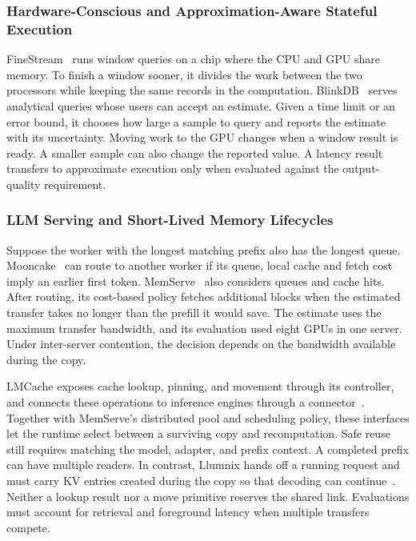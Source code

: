 \documentclass[manuscript]{acmart}
\begin{document}
\subsubsection{Hardware-Conscious and Approximation-Aware Stateful Execution}

FineStream~\cite{zhang2020finestream} runs window queries on a chip where the CPU and GPU share memory. To finish a window sooner, it divides the work between the two processors while keeping the same records in the computation. BlinkDB~\cite{agarwal2013blinkdb} serves analytical queries whose users can accept an estimate. Given a time limit or an error bound, it chooses how large a sample to query and reports the estimate with its uncertainty. Moving work to the GPU changes when a window result is ready. A smaller sample can also change the reported value. A latency result transfers to approximate execution only when evaluated against the output-quality requirement.

\subsubsection{LLM Serving and Short-Lived Memory Lifecycles}\label{sec:serving-comparison}

Suppose the worker with the longest matching prefix also has the longest queue. Mooncake~\cite{qin2025mooncake} can route to another worker if its queue, local cache and fetch cost imply an earlier first token. MemServe~\cite{hu2024memserve} also considers queues and cache hits. After routing, its cost-based policy fetches additional blocks when the estimated transfer takes no longer than the prefill it would save. The estimate uses the maximum transfer bandwidth, and its evaluation used eight GPUs in one server. Under inter-server contention, the decision depends on the bandwidth available during the copy.

LMCache exposes cache lookup, pinning, and movement through its controller, and connects these operations to inference engines through a connector~\cite{liu2025lmcache}. Together with MemServe's distributed pool and scheduling policy, these interfaces let the runtime select between a surviving copy and recomputation. Safe reuse still requires matching the model, adapter, and prefix context. A completed prefix can have multiple readers. In contrast, Llumnix hands off a running request and must carry KV entries created during the copy so that decoding can continue~\cite{sun2024llumnix}. Neither a lookup result nor a move primitive reserves the shared link. Evaluations must account for retrieval and foreground latency when multiple transfers compete.
\end{document}
